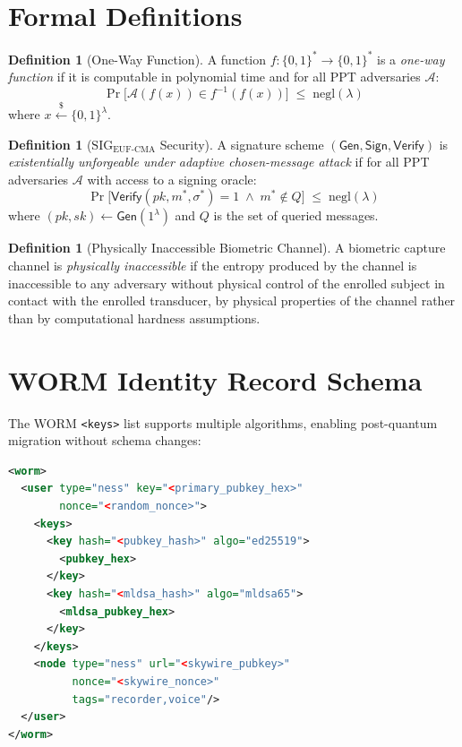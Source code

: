 \documentclass[11pt,a4paper]{article}
\theoremstyle{definition}
\newtheorem{definition}[theorem]{Definition}
\newcommand{\SIG}{\mathrm{SIG}}
\newcommand{\EUFCMA}{\mathrm{EUF\text{-}CMA}}
\newcommand{\negl}{\mathrm{negl}}
\begin{document}
\appendix

\section{Formal Definitions}
\label{app:defs}

\begin{definition}[One-Way Function]
A function $f: \{0,1\}^* \to \{0,1\}^*$ is a \emph{one-way
function} if it is computable in polynomial time and for all PPT
adversaries $\mathcal{A}$:
\[
  \Pr\bigl[\mathcal{A}(f(x)) \in f^{-1}(f(x))\bigr]
  \;\leq\; \negl(\lambda)
\]
where $x \xleftarrow{\$} \{0,1\}^\lambda$.
\end{definition}

\begin{definition}[$\SIG_{\EUFCMA}$ Security]
A signature scheme $(\mathsf{Gen}, \mathsf{Sign}, \mathsf{Verify})$
is \emph{existentially unforgeable under adaptive chosen-message
attack} if for all PPT adversaries $\mathcal{A}$ with access to a
signing oracle:
\[
  \Pr\bigl[\mathsf{Verify}(\mathit{pk}, m^*, \sigma^*) = 1
  \;\wedge\; m^* \notin Q\bigr]
  \;\leq\; \negl(\lambda)
\]
where $(\mathit{pk}, \mathit{sk}) \gets \mathsf{Gen}(1^\lambda)$
and $Q$ is the set of queried messages.
\end{definition}

\begin{definition}[Physically Inaccessible Biometric Channel]
\label{def:physical_channel}
A biometric capture channel is \emph{physically inaccessible} if
the entropy produced by the channel is inaccessible to any adversary
without physical control of the enrolled subject in contact with the
enrolled transducer, by physical properties of the channel rather
than by computational hardness assumptions.
\end{definition}

\section{WORM Identity Record Schema}
\label{app:worm}

The WORM \texttt{<keys>} list supports multiple algorithms,
enabling post-quantum migration without schema changes:

\begin{lstlisting}[language=XML]
<worm>
  <user type="ness" key="<primary_pubkey_hex>"
        nonce="<random_nonce>">
    <keys>
      <key hash="<pubkey_hash>" algo="ed25519">
        <pubkey_hex>
      </key>
      <key hash="<mldsa_hash>" algo="mldsa65">
        <mldsa_pubkey_hex>
      </key>
    </keys>
    <node type="ness" url="<skywire_pubkey>"
          nonce="<skywire_nonce>"
          tags="recorder,voice"/>
  </user>
</worm>
\end{lstlisting}
\end{document}
